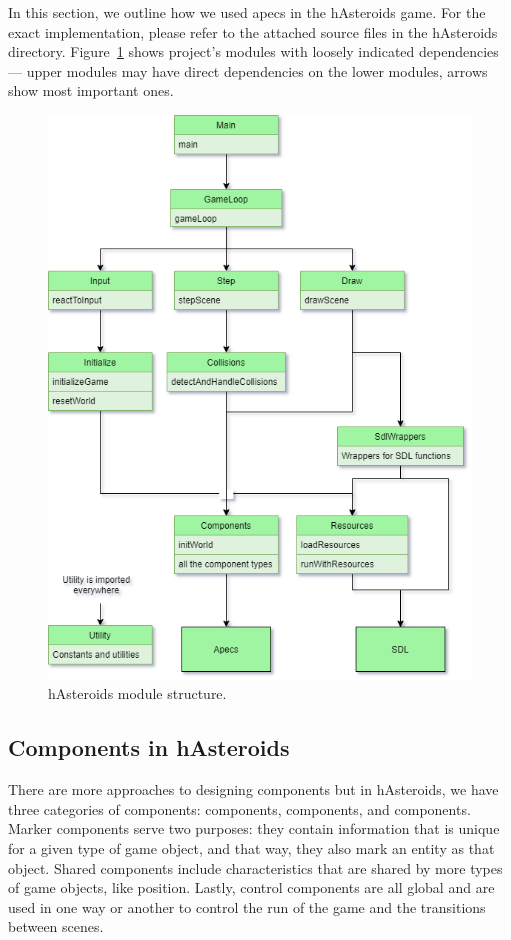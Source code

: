 \documentclass[
  digital, %
  color,   %
  table,   %
  oneside, %
  lof,     %
  lot,     %
]{fithesis3}
\begin{document}
\noindent In this section, we outline how we used apecs in the hAsteroids game.
For the exact implementation, please refer to the attached source files in the hAsteroids directory.
Figure~\ref{fig:hasteroidsmodules} shows project's modules with loosely indicated
dependencies --- upper modules may have direct dependencies on the lower modules,
arrows show most important ones. %
\begin{figure}
    \centering
    \includegraphics[width=\textwidth]{images/modules.png}
    \caption{hAsteroids module structure.}
    \label{fig:hasteroidsmodules}
\end{figure}


\subsection{Components in hAsteroids}
There are more approaches to designing components but in hAsteroids,
we have three categories of components:  components,
 components, and  components. Marker components serve two purposes:
they contain information that is unique for a given type of game object,
and that way, they also mark an entity as that object.
Shared components include characteristics that are shared by more types
of game objects, like position. Lastly, control components are all global
and are used in one way or another to control the run of the game and the transitions between scenes.
\end{document}
